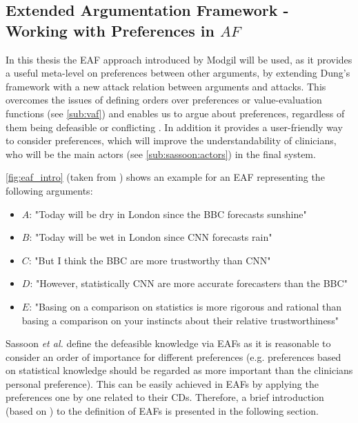 \subsection{Extended Argumentation Framework - Working with Preferences in $AF$}
\label{sub:eaf}



In this thesis the \gls{EAF} approach introduced by Modgil \cite{Modgil2009} will be used, as it provides a useful meta-level on preferences between other arguments, by extending Dung's framework with a new attack relation between arguments and attacks. This overcomes the issues of defining orders over preferences or value-evaluation functions (see \autoref{sub:vaf}) and enables us to argue about preferences, regardless of them being  defeasible or conflicting \cite{amgoud2000}. In addition it provides a user-friendly way to consider preferences, which will improve the understandability of clinicians, who will be the main actors (see \autoref{sub:sassoon:actors}) in the final system.

\autoref{fig:eaf_intro} (taken from \cite{Modgil2009}) shows an example for an \gls{EAF} representing the following arguments:

\begin{itemize}
	\item $A$: "Today will be dry in London since the BBC forecasts sunshine"
	\item $B$: "Today will be wet in London since CNN forecasts rain"
	\item $C$: "But I think the BBC are more trustworthy than CNN"
	\item $D$: "However, statistically CNN are more accurate forecasters than the BBC"
	\item $E$: "Basing on a comparison on statistics is more rigorous and rational than basing a comparison on your instincts about their relative trustworthiness"
\end{itemize}

\bigskip

Sassoon \textit{et al.} define the defeasible knowledge via \Glspl{EAF} \cite{sassoon2016CD} as it is reasonable to consider an order of importance for different preferences (e.g. preferences based on statistical knowledge should be regarded as more important than the clinicians personal preference). This can be easily achieved in \glspl{EAF} by applying the preferences one by one related to their \glspl{CD}. Therefore, a brief introduction (based on \cite{Modgil2009}) to the definition of \glspl{EAF} is presented in the following section.

